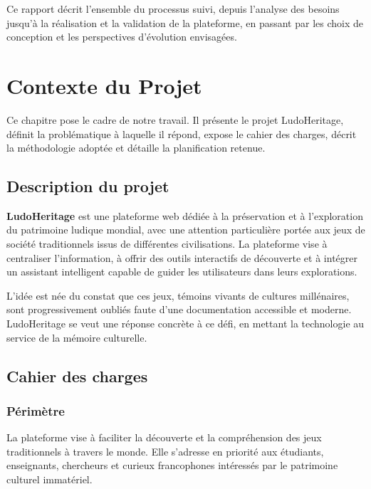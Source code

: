 \documentclass[12pt,a4paper]{report}
\begin{document}
Ce rapport décrit l'ensemble du processus suivi, depuis l'analyse des besoins jusqu'à
la réalisation et la validation de la plateforme, en passant par les choix de conception
et les perspectives d'évolution envisagées.

\chapter{Contexte du Projet}

Ce chapitre pose le cadre de notre travail. Il présente le projet LudoHeritage, définit
la problématique à laquelle il répond, expose le cahier des charges, décrit la méthodologie
adoptée et détaille la planification retenue.

\section{Description du projet}

\textbf{LudoHeritage} est une plateforme web dédiée à la préservation et à l'exploration
du patrimoine ludique mondial, avec une attention particulière portée aux jeux de société
traditionnels issus de différentes civilisations. La plateforme vise à centraliser
l'information, à offrir des outils interactifs de découverte et à intégrer un assistant
intelligent capable de guider les utilisateurs dans leurs explorations.

L'idée est née du constat que ces jeux, témoins vivants de cultures millénaires, sont
progressivement oubliés faute d'une documentation accessible et moderne. LudoHeritage
se veut une réponse concrète à ce défi, en mettant la technologie au service de la mémoire
culturelle.

\section{Cahier des charges}

\subsection{Périmètre}

La plateforme vise à faciliter la découverte et la compréhension des jeux traditionnels
à travers le monde. Elle s'adresse en priorité aux étudiants, enseignants, chercheurs et
curieux francophones intéressés par le patrimoine culturel immatériel.
\end{document}
